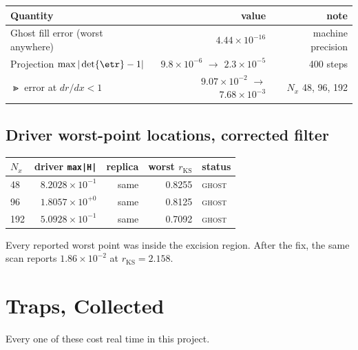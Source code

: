 \begin{center}
\begin{tabular}{@{}lrr@{}}
\toprule
Quantity & value & note \\
\midrule
Ghost fill error (worst anywhere) & $4.44\times10^{-16}$ & machine precision \\
Projection $\max|\det\etr - 1|$ & $9.8\times10^{-6}$ $\to$ $2.3\times10^{-5}$ & 400 steps \\
$\Gt$ error at $dr/dx < 1$ & $9.07\times10^{-2}$ $\to$ $7.68\times10^{-3}$ & $N_x$ 48, 96, 192 \\
\bottomrule
\end{tabular}
\end{center}

\subsection{Driver worst-point locations, corrected filter}

\begin{center}
\begin{tabular}{@{}lrrrl@{}}
\toprule
$N_x$ & driver \texttt{max|H|} & replica & worst $r_{\mathrm{KS}}$ & status \\
\midrule
48  & $8.2028\times10^{-1}$ & same & 0.8255 & \textsc{ghost} \\
96  & $1.8057\times10^{+0}$ & same & 0.8125 & \textsc{ghost} \\
192 & $5.0928\times10^{-1}$ & same & 0.7092 & \textsc{ghost} \\
\bottomrule
\end{tabular}
\end{center}

Every reported worst point was inside the excision region. After the fix, the
same scan reports $1.86\times10^{-2}$ at $r_{\mathrm{KS}} = 2.158$.

\section{Traps, Collected}
\label{app:traps}

Every one of these cost real time in this project.

